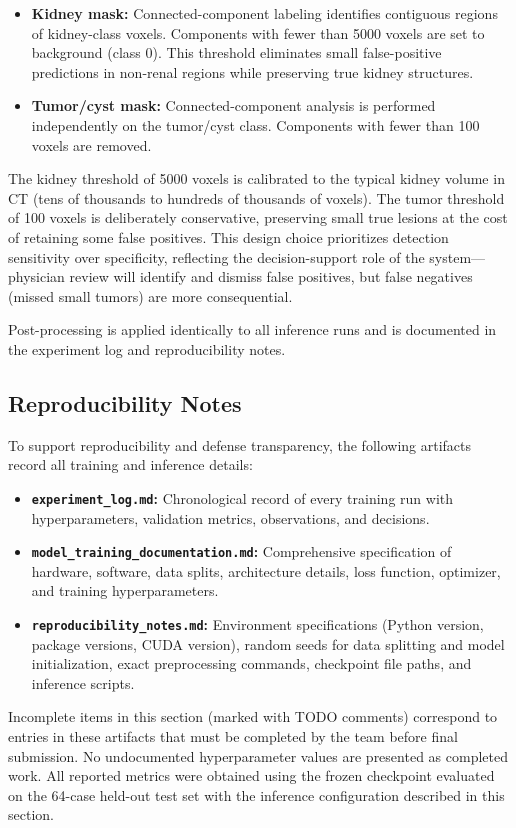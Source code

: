 \begin{itemize}
    \item \textbf{Kidney mask:} Connected-component labeling identifies contiguous regions of kidney-class voxels. Components with fewer than 5000 voxels are set to background (class 0). This threshold eliminates small false-positive predictions in non-renal regions while preserving true kidney structures.
    \item \textbf{Tumor/cyst mask:} Connected-component analysis is performed independently on the tumor/cyst class. Components with fewer than 100 voxels are removed.
\end{itemize}

The kidney threshold of 5000 voxels is calibrated to the typical kidney volume in CT (tens of thousands to hundreds of thousands of voxels). The tumor threshold of 100 voxels is deliberately conservative, preserving small true lesions at the cost of retaining some false positives. This design choice prioritizes detection sensitivity over specificity, reflecting the decision-support role of the system---physician review will identify and dismiss false positives, but false negatives (missed small tumors) are more consequential.

Post-processing is applied identically to all inference runs and is documented in the experiment log and reproducibility notes.

\subsection{Reproducibility Notes}

To support reproducibility and defense transparency, the following artifacts record all training and inference details:

\begin{itemize}
    \item \textbf{\texttt{experiment\_log.md}:} Chronological record of every training run with hyperparameters, validation metrics, observations, and decisions.
    \item \textbf{\texttt{model\_training\_documentation.md}:} Comprehensive specification of hardware, software, data splits, architecture details, loss function, optimizer, and training hyperparameters.
    \item \textbf{\texttt{reproducibility\_notes.md}:} Environment specifications (Python version, package versions, CUDA version), random seeds for data splitting and model initialization, exact preprocessing commands, checkpoint file paths, and inference scripts.
\end{itemize}

Incomplete items in this section (marked with TODO comments) correspond to entries in these artifacts that must be completed by the team before final submission. No undocumented hyperparameter values are presented as completed work. All reported metrics were obtained using the frozen checkpoint evaluated on the 64-case held-out test set with the inference configuration described in this section.
